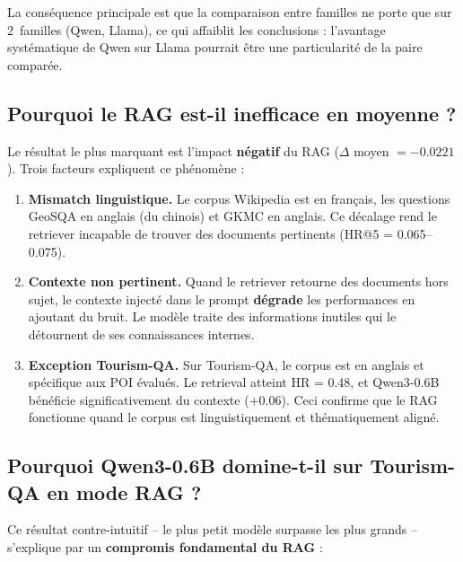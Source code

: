 \documentclass[12pt,a4paper]{article}
\begin{document}
La conséquence principale est que la comparaison entre familles ne porte que sur
2~familles (Qwen, Llama), ce qui affaiblit les conclusions : l'avantage systématique
de Qwen sur Llama pourrait être une particularité de la paire comparée.

\subsection{Pourquoi le RAG est-il inefficace en moyenne ?}

Le r\'esultat le plus marquant est l'impact \textbf{n\'egatif} du RAG ($\Delta$ moyen
$= -0.0221$). Trois facteurs expliquent ce ph\'enom\`ene :

\begin{enumerate}[leftmargin=*]
  \item \textbf{Mismatch linguistique.} Le corpus Wikipedia est en fran\c{c}ais, les
  questions GeoSQA en anglais (du chinois) et GKMC en anglais. Ce d\'ecalage rend le
  retriever incapable de trouver des documents pertinents (HR@5 = 0.065--0.075).
  \item \textbf{Contexte non pertinent.} Quand le retriever retourne des documents hors
  sujet, le contexte inject\'e dans le prompt \textbf{d\'egrade} les performances en
  ajoutant du bruit. Le mod\`ele traite des informations inutiles qui le d\'etournent
  de ses connaissances internes.
  \item \textbf{Exception Tourism-QA.} Sur Tourism-QA, le corpus est en anglais et
  sp\'ecifique aux POI \'evalu\'es. Le retrieval atteint HR = 0.48, et Qwen3-0.6B
  b\'en\'eficie significativement du contexte ($+$0.06). Ceci confirme que le RAG
  fonctionne quand le corpus est linguistiquement et th\'ematiquement align\'e.
\end{enumerate}

\subsection{Pourquoi Qwen3-0.6B domine-t-il sur Tourism-QA en mode RAG ?}

Ce r\'esultat contre-intuitif -- le plus petit mod\`ele surpasse les plus grands --
s'explique par un \textbf{compromis fondamental du RAG} :
\end{document}
